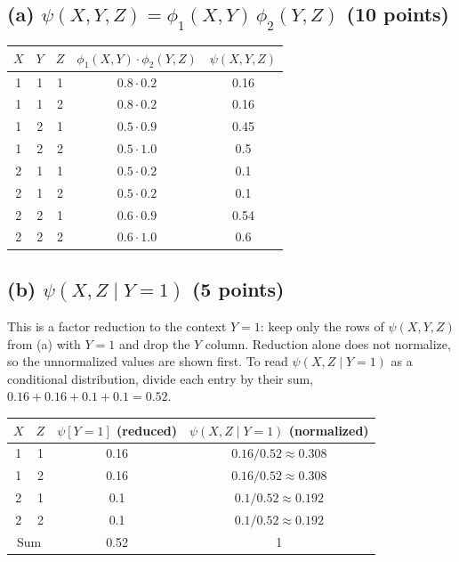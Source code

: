 \documentclass[11pt]{article}
\begin{document}
\subsection*{(a) $\psi(X,Y,Z) = \phi_1(X,Y)\,\phi_2(Y,Z)$ (10 points)}

\begin{center}
\begin{tabular}{ccc|c|c}
  \toprule
  $X$ & $Y$ & $Z$ & $\phi_1(X,Y)\cdot\phi_2(Y,Z)$ & $\psi(X,Y,Z)$ \\
  \midrule
  1 & 1 & 1 & $0.8 \cdot 0.2$ & 0.16 \\
  1 & 1 & 2 & $0.8 \cdot 0.2$ & 0.16 \\
  1 & 2 & 1 & $0.5 \cdot 0.9$ & 0.45 \\
  1 & 2 & 2 & $0.5 \cdot 1.0$ & 0.5 \\
  2 & 1 & 1 & $0.5 \cdot 0.2$ & 0.1 \\
  2 & 1 & 2 & $0.5 \cdot 0.2$ & 0.1 \\
  2 & 2 & 1 & $0.6 \cdot 0.9$ & 0.54 \\
  2 & 2 & 2 & $0.6 \cdot 1.0$ & 0.6 \\
  \bottomrule
\end{tabular}
\end{center}

\subsection*{(b) $\psi(X,Z \mid Y=1)$ (5 points)}

This is a factor reduction to the context $Y = 1$: keep only the rows of
$\psi(X,Y,Z)$ from (a) with $Y = 1$ and drop the $Y$ column. Reduction alone
does not normalize, so the unnormalized values are shown first. To read
$\psi(X,Z \mid Y=1)$ as a conditional distribution, divide each entry by
their sum, $0.16 + 0.16 + 0.1 + 0.1 = 0.52$.

\begin{center}
\begin{tabular}{cc|c|c}
  \toprule
  $X$ & $Z$ & $\psi[Y=1]$ (reduced) & $\psi(X,Z \mid Y=1)$ (normalized) \\
  \midrule
  1 & 1 & 0.16 & $0.16/0.52 \approx 0.308$ \\
  1 & 2 & 0.16 & $0.16/0.52 \approx 0.308$ \\
  2 & 1 & 0.1  & $0.1/0.52 \approx 0.192$ \\
  2 & 2 & 0.1  & $0.1/0.52 \approx 0.192$ \\
  \midrule
  \multicolumn{2}{c|}{Sum} & 0.52 & 1 \\
  \bottomrule
\end{tabular}
\end{center}
\end{document}
